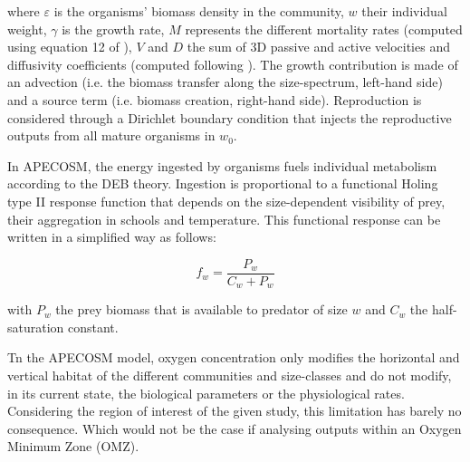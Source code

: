 where $\varepsilon$  is the organisms' biomass density in the community, $w$ their individual weight, $\gamma$ is the growth rate, $M$ represents the different mortality rates (computed using equation 12 of \citealt{mauryIndividualsPopulationsCommunities2013}), $V$ and $D$ the sum of 3D passive and active velocities and diffusivity coefficients (computed following \citealt{faugerasAdvectiondiffusionreactionSizestructuredFish2005}). The growth contribution is made of an advection (i.e. the biomass transfer along the size-spectrum, left-hand side) and a source term (i.e. biomass creation, right-hand side). Reproduction is considered through a Dirichlet boundary condition that injects the reproductive outputs from all mature organisms in $w_0$.

In APECOSM, the energy ingested by organisms fuels individual metabolism according to the DEB theory. Ingestion is proportional to a functional Holing type II response function that depends on the size-dependent visibility of prey, their aggregation in schools and temperature. This functional response can be written in a simplified way as follows:

\begin{equation}
f_{w} = \frac{P_{w}}{C_{w} + P_{w}}
\label{eq:repfonct}
\end{equation}

with $P_{w}$ the prey biomass that is available to predator of size $w$ and $C_{w}$ the half-saturation constant.

Tn the APECOSM model, oxygen concentration only modifies the horizontal and vertical habitat of the different communities and size-classes and do not modify, in its current state, the  biological parameters or the physiological rates. Considering the region of interest of the given study, this limitation has barely no consequence. Which would not be the case if analysing outputs within an Oxygen Minimum Zone (OMZ). 



